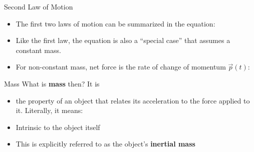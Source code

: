 \documentclass[12pt,compress,aspectratio=169]{beamer}
\begin{document}
\begin{frame}{Second Law of Motion}
  \begin{center}
  \end{center}
  \begin{itemize}
    \item The first two laws of motion can be summarized in the equation:

  \item\textcolor{red!80!black}{Like the first law, the equation is also a
    ``special case'' that assumes a constant mass.}
  \item For non-constant mass, net force is the rate of change of momentum
    $\vec p(t)$:

  \end{itemize}
\end{frame}



\begin{frame}{Mass}
  What is \textbf{mass} then? It is
  \begin{itemize}
  \item the property of an object that relates its acceleration to the force
    applied to it. Literally, it means:

  \item Intrinsic to the object itself
  \item This is explicitly referred to as the object's \textbf{inertial mass}
  \end{itemize}
\end{frame}
\end{document}

